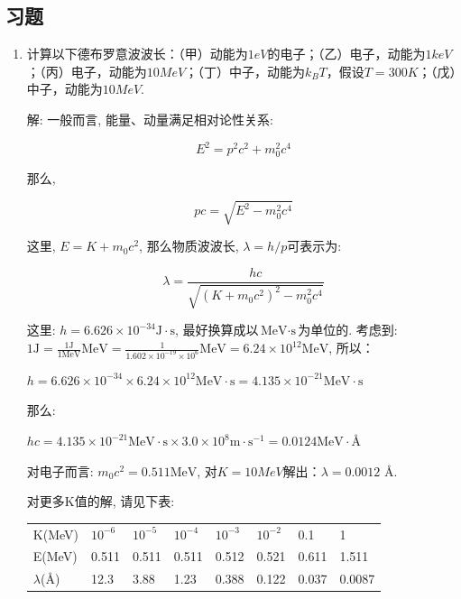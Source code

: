 \subsection*{习题}


\begin{enumerate}
  \item 计算以下德布罗意波波长：（甲）动能为$1eV$的电子；（乙）电子，动能为$1keV$；（丙）电子，动能为$10MeV$；（丁）中子，动能为$k_B T$，假设$T=300K$；（戊）中子，动能为$10 MeV$.

解: 一般而言, 能量、动量满足相对论性关系:

\begin{equation*}
E^2 = p^2 c^2 + m_0^2 c^4
\end{equation*}

那么,

\begin{equation*}
pc = \sqrt{E^2 - m_0^2 c^4}
\end{equation*}

这里, $E = K + m_0c^2$, 那么物质波波长, $\lambda = h/p$可表示为:

\begin{equation*}
\lambda = \frac{hc}{\sqrt{(K + m_0c^2)^2 - m_0^2 c^4}}
\end{equation*}

这里: $h = 6.626 \times 10^{-34} \text{J} \cdot \text{s}$,
最好换算成以$\text{MeV} \cdot \text{s}$为单位的. 考虑到: $1 \text{J}
= \frac{1 \text{J}}{ 1 \text{MeV}} \text{MeV} = \frac{1}{1.602
\times 10^{-19} \times 10^6} \text{MeV} = 6.24 \times 10^{12}
\text{MeV}$, 所以：

$h = 6.626 \times 10^{-34} \times 6.24 \times 10^{12} \text{MeV}
\cdot \text{s} = 4.135 \times 10^{-21} \text{MeV} \cdot \text{s}$

那么:

$hc = 4.135 \times 10^{-21} \text{MeV} \cdot \text{s} \times 3.0
\times 10^8 \text{m} \cdot \text{s}^{-1} = 0.0124 \text{MeV} \cdot
${\AA}

对电子而言: $m_0 c^2 = 0.511 \text{MeV}$, 对$K = 10
MeV$解出：$\lambda = 0.0012$ \AA.

对更多K值的解, 请见下表:

\begin{center}
\begin{tabular}{|l|l|l|l|l|l|l|l|}
  \hline
  K(MeV) & $10^{-6}$ & $10^{-5}$ & $10^{-4}$ & $10^{-3}$ & $10^{-2}$ & 0.1 & 1  \\
  E(MeV) & 0.511 & 0.511 & 0.511 & 0.512 & 0.521 & 0.611 & 1.511  \\
  $\lambda$({\AA}) & 12.3 & 3.88 & 1.23 & 0.388 & 0.122 & 0.037 & 0.0087  \\
  \hline
\end{tabular}
\end{center}



\end{enumerate}
